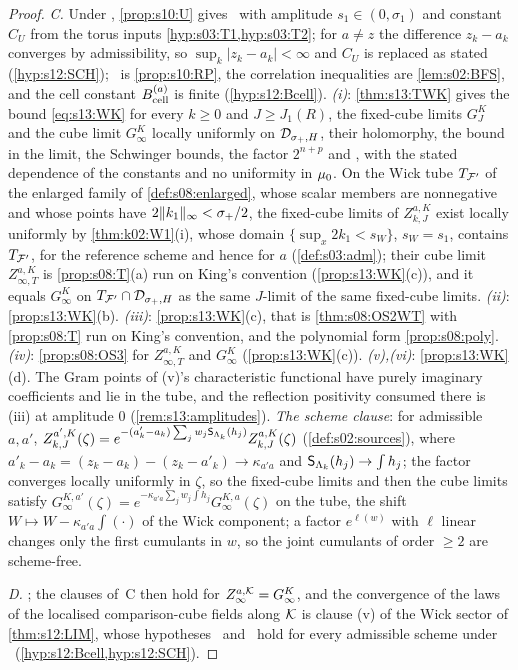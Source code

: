 \begin{proof}
\emph{C.} Under \Tthree, \cref{prop:s10:U} gives \Itwo\ with amplitude $s_1\in(0,\sigma_1)$ and constant $C_U$ from the torus inputs \cref{hyp:s03:T1,hyp:s03:T2}; for $a\ne z$ the difference $z_k-a_k$ converges by admissibility, so $\sup_k|z_k-a_k|<\infty$ and $C_U$ is replaced as stated (\cref{hyp:s12:SCH}); \Ithree\ is \cref{prop:s10:RP}, the correlation inequalities are \cref{lem:s02:BFS}, and the cell constant $B^{(a)}_{\rm cell}$ is finite (\cref{hyp:s12:Bcell}). \emph{(i)}: \cref{thm:s13:TWK} gives the bound \eqref{eq:s13:WK} for every $k\ge0$ and $J\ge J_1(R)$, the fixed-cube limits $G^K_J$ and the cube limit $G^K_\infty$ locally uniformly on $\mathcal D_{\sigma_+,H}$, their holomorphy, the bound in the limit, the Schwinger bounds, the factor $2^{n+p}$ and \Ezz, with the stated dependence of the constants and no uniformity in $\mu_0$. On the Wick tube $T_{\mathcal F'}$ of the enlarged family of \cref{def:s08:enlarged}, whose scalar members are nonnegative and whose points have $2\lVert k_1\rVert_\infty<\sigma_+/2$, the fixed-cube limits of $Z^{a,K}_{k,J}$ exist locally uniformly by \cref{thm:k02:W1}(i), whose domain $\{\sup_x2k_1<s_W\}$, $s_W=s_1$, contains $T_{\mathcal F'}$, for the reference scheme and hence for $a$ (\cref{def:s03:adm}); their cube limit $Z^{a,K}_{\infty,T}$ is \cref{prop:s08:T}(a) run on King's convention (\cref{prop:s13:WK}(c)), and it equals $G^K_\infty$ on $T_{\mathcal F'}\cap\mathcal D_{\sigma_+,H}$ as the same $J$-limit of the same fixed-cube limits. \emph{(ii)}: \cref{prop:s13:WK}(b). \emph{(iii)}: \cref{prop:s13:WK}(c), that is \cref{thm:s08:OS2WT} with \cref{prop:s08:T} run on King's convention, and the polynomial form \cref{prop:s08:poly}. \emph{(iv)}: \cref{prop:s08:OS3} for $Z^{a,K}_{\infty,T}$ and $G^K_\infty$ (\cref{prop:s13:WK}(c)). \emph{(v),(vi)}: \cref{prop:s13:WK}(d). The Gram points of (v)'s characteristic functional have purely imaginary coefficients and lie in the tube, and the reflection positivity consumed there is (iii) at amplitude $0$ (\cref{rem:s13:amplitudes}). \emph{The scheme clause}: for admissible $a,a'$, $Z^{a',K}_{k,J}(\zeta)=e^{-(a'_k-a_k)\sum_jw_j\mathsf S_{\Lambda_k}(h_j)}Z^{a,K}_{k,J}(\zeta)$ (\cref{def:s02:sources}), where $a'_k-a_k=(z_k-a_k)-(z_k-a'_k)\to\kappa_{a'a}$ and $\mathsf S_{\Lambda_k}(h_j)\to\int h_j$; the factor converges locally uniformly in $\zeta$, so the fixed-cube limits and then the cube limits satisfy $G^{K,a'}_\infty(\zeta)=e^{-\kappa_{a'a}\sum_jw_j\int h_j}G^{K,a}_\infty(\zeta)$ on the tube, the shift $W\mapsto W-\kappa_{a'a}\int(\cdot)$ of the Wick component; a factor $e^{\ell(w)}$ with $\ell$ linear changes only the first cumulants in $w$, so the joint cumulants of order $\ge2$ are scheme-free.

\emph{D.} ; the clauses of~C then hold for $Z^{a,\mathcal K}_\infty=G^K_\infty$, and the convergence of the laws of the localised comparison-cube fields along $\mathcal K$ is clause (v) of the Wick sector of \cref{thm:s12:LIM}, whose hypotheses \Bcell\ and \SCH\ hold for every admissible scheme under \Tthree\ (\cref{hyp:s12:Bcell,hyp:s12:SCH}).
\end{proof}

